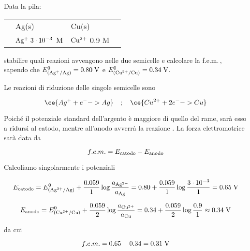 \begin{esercizio}
    Data la pila:

\begin{center}
    \begin{tabular}{p{0.6cm}|p{3cm}||p{3cm}|p{1cm}}
        & Ag(s) & Cu(s) & \\[0.5ex]
        & $\rm Ag^{+}\;3 \cdot 10^{-3}$ M & $\rm Cu^{2+}$ 0.9 M&\\[0.5ex]
    \end{tabular}
\end{center}

stabilire quali reazioni avvengono nelle due semicelle e calcolare la f.e.m.\,, sapendo che $E^0_{(\rm Ag^{+}/Ag)}=0.80 \; \rm V$ e $E^0_{(\rm Cu^{2+}/Cu)}=0.34 \; \rm V$.
\end{esercizio}
\begin{soluzione}
    Le reazioni di riduzione delle singole semicelle sono

$$\ce{Ag^{+} + e^- -> Ag}
\quad;\quad
\ce{Cu^{2+} + 2 e^- -> Cu}$$

Poiché il potenziale standard dell'argento è maggiore di quello del rame, sarà esso a ridursi al catodo, mentre all'anodo avverrà la reazione . La forza elettromotrice sarà data da

$$f.e.m. = E_{\rm catodo} - E_{\rm anodo}$$

Calcoliamo singolarmente i potenziali

$$E_{\rm catodo}
=E^0_{(\rm Ag^{2+}/Ag)} + \frac{0.059}{1} \log \frac{a_{\rm Ag^{2+}}}{a_{\rm Ag}}
=0.80 + \frac{0.059}{1} \log \frac{3 \cdot 10^{-3}}{1}
=0.65 \; \rm V$$

$$E_{\rm anodo} = E^0_{(\rm Cu^{2+}/Cu)} + \frac{0.059}{2} \log \frac{a_{\rm Cu^{2+}}}{a_{\rm Cu}}
=0.34 + \frac{0.059}{2} \log \frac{0.9}{1}
\approx 0.34 \; \rm V$$

da cui

$$f.e.m.=0.65 - 0.34 = 0.31 \; \rm V$$
\end{soluzione}

\newpage

